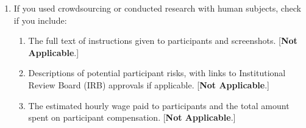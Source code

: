 \documentclass[twoside]{article}
\begin{document}
\begin{enumerate}
  \item If you used crowdsourcing or conducted research with human subjects, check if you include:
  \begin{enumerate}
    \item The full text of instructions given to participants and screenshots.
    [\textbf{Not Applicable}.]

    \item Descriptions of potential participant risks, with links to Institutional Review Board (IRB) approvals if applicable.
    [\textbf{Not Applicable}.]

    \item The estimated hourly wage paid to participants and the total amount spent on participant compensation.
    [\textbf{Not Applicable}.]
  \end{enumerate}

\end{enumerate}
\clearpage
\appendix
\thispagestyle{empty}
\onecolumn
\end{document}
